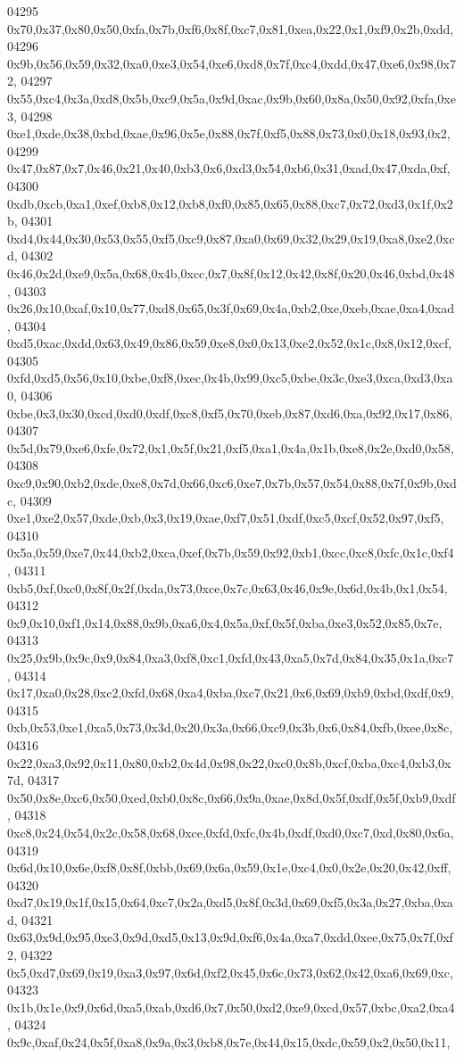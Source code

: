 \begin{DoxyCode}
04295   0x70,0x37,0x80,0x50,0xfa,0x7b,0xf6,0x8f,0xc7,0x81,0xea,0x22,0x1,0xf9,0x2b,0xdd,
04296   0x9b,0x56,0x59,0x32,0xa0,0xe3,0x54,0xe6,0xd8,0x7f,0xc4,0xdd,0x47,0xe6,0x98,0x72,
04297   0x55,0xc4,0x3a,0xd8,0x5b,0xc9,0x5a,0x9d,0xac,0x9b,0x60,0x8a,0x50,0x92,0xfa,0xe3,
04298   0xe1,0xde,0x38,0xbd,0xae,0x96,0x5e,0x88,0x7f,0xf5,0x88,0x73,0x0,0x18,0x93,0x2,
04299   0x47,0x87,0x7,0x46,0x21,0x40,0xb3,0x6,0xd3,0x54,0xb6,0x31,0xad,0x47,0xda,0xf,
04300   0xdb,0xcb,0xa1,0xef,0xb8,0x12,0xb8,0xf0,0x85,0x65,0x88,0xc7,0x72,0xd3,0x1f,0x2b,
04301   0xd4,0x44,0x30,0x53,0x55,0xf5,0xc9,0x87,0xa0,0x69,0x32,0x29,0x19,0xa8,0xe2,0xcd,
04302   0x46,0x2d,0xe9,0x5a,0x68,0x4b,0xcc,0x7,0x8f,0x12,0x42,0x8f,0x20,0x46,0xbd,0x48,
04303   0x26,0x10,0xaf,0x10,0x77,0xd8,0x65,0x3f,0x69,0x4a,0xb2,0xe,0xeb,0xae,0xa4,0xad,
04304   0xd5,0xac,0xdd,0x63,0x49,0x86,0x59,0xe8,0x0,0x13,0xe2,0x52,0x1c,0x8,0x12,0xcf,
04305   0xfd,0xd5,0x56,0x10,0xbe,0xf8,0xec,0x4b,0x99,0xc5,0xbe,0x3c,0xe3,0xca,0xd3,0xa0,
04306   0xbe,0x3,0x30,0xcd,0xd0,0xdf,0xc8,0xf5,0x70,0xeb,0x87,0xd6,0xa,0x92,0x17,0x86,
04307   0x5d,0x79,0xe6,0xfe,0x72,0x1,0x5f,0x21,0xf5,0xa1,0x4a,0x1b,0xe8,0x2e,0xd0,0x58,
04308   0xc9,0x90,0xb2,0xde,0xe8,0x7d,0x66,0xc6,0xe7,0x7b,0x57,0x54,0x88,0x7f,0x9b,0xdc,
04309   0xe1,0xe2,0x57,0xde,0xb,0x3,0x19,0xae,0xf7,0x51,0xdf,0xc5,0xcf,0x52,0x97,0xf5,
04310   0x5a,0x59,0xe7,0x44,0xb2,0xca,0xef,0x7b,0x59,0x92,0xb1,0xcc,0xc8,0xfc,0x1c,0xf4,
04311   0xb5,0xf,0xc0,0x8f,0x2f,0xda,0x73,0xce,0x7c,0x63,0x46,0x9e,0x6d,0x4b,0x1,0x54,
04312   0x9,0x10,0xf1,0x14,0x88,0x9b,0xa6,0x4,0x5a,0xf,0x5f,0xba,0xe3,0x52,0x85,0x7e,
04313   0x25,0x9b,0x9c,0x9,0x84,0xa3,0xf8,0xc1,0xfd,0x43,0xa5,0x7d,0x84,0x35,0x1a,0xc7,
04314   0x17,0xa0,0x28,0xc2,0xfd,0x68,0xa4,0xba,0xc7,0x21,0x6,0x69,0xb9,0xbd,0xdf,0x9,
04315   0xb,0x53,0xe1,0xa5,0x73,0x3d,0x20,0x3a,0x66,0xc9,0x3b,0x6,0x84,0xfb,0xee,0x8c,
04316   0x22,0xa3,0x92,0x11,0x80,0xb2,0x4d,0x98,0x22,0xc0,0x8b,0xcf,0xba,0xc4,0xb3,0x7d,
04317   0x50,0x8e,0xc6,0x50,0xed,0xb0,0x8c,0x66,0x9a,0xae,0x8d,0x5f,0xdf,0x5f,0xb9,0xdf,
04318   0xc8,0x24,0x54,0x2c,0x58,0x68,0xce,0xfd,0xfc,0x4b,0xdf,0xd0,0xc7,0xd,0x80,0x6a,
04319   0x6d,0x10,0x6e,0xf8,0x8f,0xbb,0x69,0x6a,0x59,0x1e,0xc4,0x0,0x2e,0x20,0x42,0xff,
04320   0xd7,0x19,0x1f,0x15,0x64,0xc7,0x2a,0xd5,0x8f,0x3d,0x69,0xf5,0x3a,0x27,0xba,0xad,
04321   0x63,0x9d,0x95,0xe3,0x9d,0xd5,0x13,0x9d,0xf6,0x4a,0xa7,0xdd,0xee,0x75,0x7f,0xf2,
04322   0x5,0xd7,0x69,0x19,0xa3,0x97,0x6d,0xf2,0x45,0x6c,0x73,0x62,0x42,0xa6,0x69,0xc,
04323   0x1b,0x1e,0x9,0x6d,0xa5,0xab,0xd6,0x7,0x50,0xd2,0xe9,0xcd,0x57,0xbc,0xa2,0xa4,
04324   0x9c,0xaf,0x24,0x5f,0xa8,0x9a,0x3,0xb8,0x7e,0x44,0x15,0xdc,0x59,0x2,0x50,0x11,

\end{DoxyCode}
